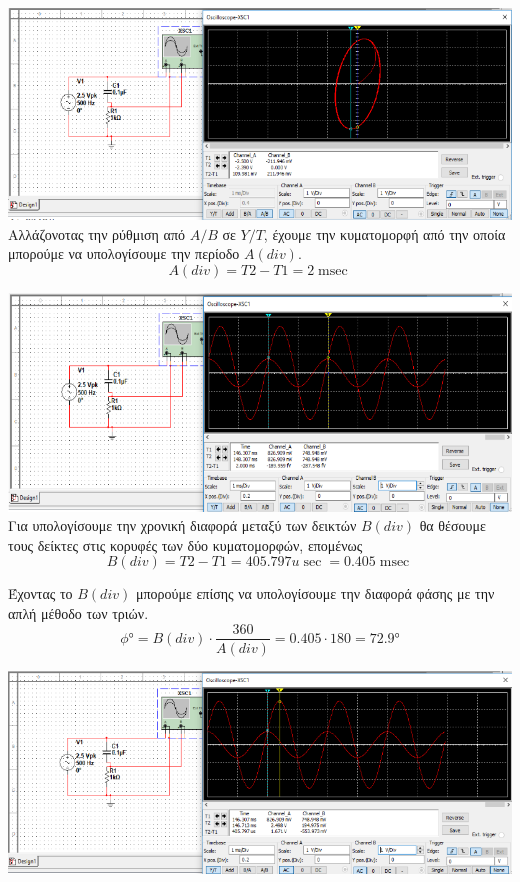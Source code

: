 \documentclass{article}
\begin{document}
\includegraphics[width=\textwidth]{./res/ex4circ.png} \\

Aλλάζονοτας την ρύθμιση από $A/B$ σε $Y/T$, έχουμε την κυματομορφή
από την οποία μπορούμε να υπολογίσουμε την περίοδο $A(div)$.
\[A(div) = T2 - T1 = 2\si{\milli\sec}\]

\includegraphics[width=\textwidth]{./res/ex4wave1.png} \\

Για υπολογίσουμε την χρονική διαφορά μεταξύ των δεικτών $B(div)$ θα θέσουμε τους δείκτες
στις κορυφές των δύο κυματομορφών, επομένως
\[B(div) = T2 - T1 = 405.797\si{u\sec} = 0.405\si{\milli\sec}\]

Έχοντας το $B(div)$ μπορούμε επίσης να υπολογίσουμε την διαφορά φάσης με την
απλή μέθοδο των τριών.
\[\si{\phi\degree} = B(div) \cdot \frac{360}{A(div)} = 0.405 \cdot 180 = 72.9\si{\degree}\]

\includegraphics[width=\textwidth]{./res/ex4wave2.png} \\
\end{document}
